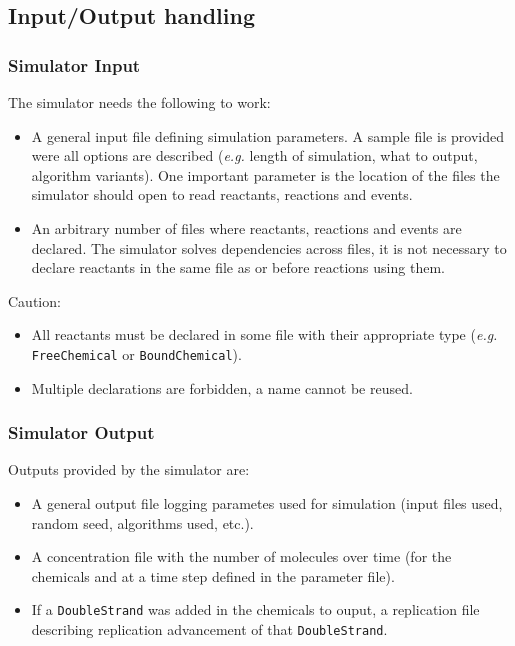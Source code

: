 
\subsection{Input/Output handling}

\subsubsection{Simulator Input}

The simulator needs the following to work:
\begin{itemize}
  \item A general input file defining simulation parameters. A sample file is provided were all options are described (\textit{e.g.} length of simulation, what to output, algorithm variants). One important parameter is the location of the files the simulator should open to read reactants, reactions and events.
  \item An arbitrary number of files where reactants, reactions and events are declared. The simulator solves dependencies across files, it is not necessary to declare reactants in the same file as or before reactions using them.
\end{itemize}

Caution:
\begin{itemize}
\item All reactants must be declared in some file with their appropriate type (\textit{e.g.} \texttt{FreeChemical} or \texttt{BoundChemical}).
\item Multiple declarations are forbidden, a name cannot be reused.
\end{itemize}

\subsubsection{Simulator Output}

Outputs provided by the simulator are:
\begin{itemize}
\item A general output file logging parametes used for simulation (input files used, random seed, algorithms used, etc.).
\item A concentration file with the number of molecules over time (for the chemicals and at a time step defined in the parameter file).
\item If a \texttt{DoubleStrand} was added in the chemicals to ouput, a replication file describing replication advancement of that \texttt{DoubleStrand}.
\end{itemize}
